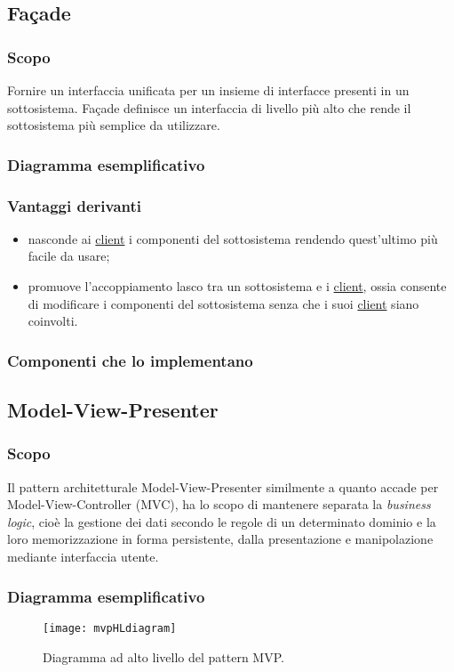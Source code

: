 \subsection{Façade}
\subsubsection{Scopo}
Fornire un interfaccia unificata per un insieme di interfacce presenti in un sottosistema. Façade definisce un interfaccia di livello più alto che rende il sottosistema più semplice da utilizzare.
\subsubsection{Diagramma esemplificativo}
\subsubsection{Vantaggi derivanti}
\begin{itemize}
\item nasconde ai \underline{client} i componenti del sottosistema rendendo quest'ultimo più facile da usare;
\item promuove l'accoppiamento lasco tra un sottosistema e i \underline{client}, ossia consente di modificare i componenti del sottosistema senza che i suoi \underline{client} siano coinvolti.
\end{itemize}
\subsubsection{Componenti che lo implementano}

\subsection{Model-View-Presenter}

\subsubsection{Scopo}
Il pattern architetturale \foreignlanguage{english}{Model-View-Presenter} similmente a quanto accade per \foreignlanguage{english}{Model-View-Controller} (MVC), ha lo scopo di mantenere separata la \textit{business logic}, cioè la gestione dei dati secondo le regole di un determinato dominio e la loro memorizzazione in forma persistente, dalla presentazione e manipolazione mediante interfaccia utente.

\subsubsection{Diagramma esemplificativo}
\begin{figure}[h]
\centering
\texttt{[image: mvpHLdiagram]}
\caption{Diagramma ad alto livello del pattern MVP.}\label{fig:mvpHL}
\end{figure}



